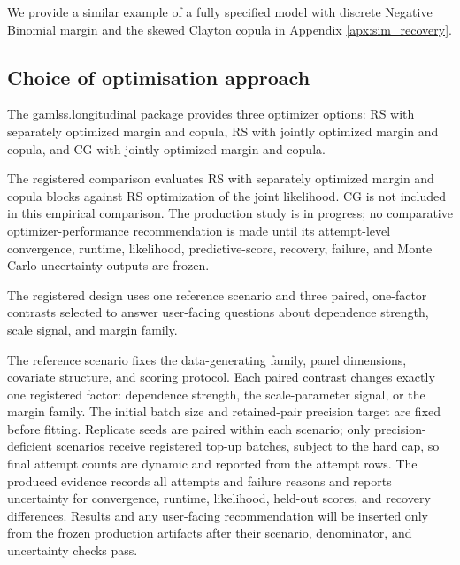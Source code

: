 \documentclass{article}
\begin{document}

We provide a similar example of a fully specified model with discrete Negative Binomial margin and the skewed Clayton copula in Appendix \ref{apx:sim_recovery}.

\subsection{Choice of optimisation approach} \label{sec:sim_jvs}
The gamlss.longitudinal package provides three optimizer options: RS with separately optimized margin and copula, RS with jointly optimized margin and copula, and CG with jointly optimized margin and copula. 

The registered comparison evaluates RS with separately optimized margin and copula blocks against RS optimization of the joint likelihood. CG is not included in this empirical comparison. The production study is in progress; no comparative optimizer-performance recommendation is made until its attempt-level convergence, runtime, likelihood, predictive-score, recovery, failure, and Monte Carlo uncertainty outputs are frozen.

The registered design uses one reference scenario and three paired, one-factor contrasts selected to answer user-facing questions about dependence strength, scale signal, and margin family.

The reference scenario fixes the data-generating family, panel dimensions,
covariate structure, and scoring protocol.  Each paired contrast changes exactly
one registered factor: dependence strength, the scale-parameter signal, or the
margin family. The initial batch size and retained-pair precision target are
fixed before fitting. Replicate seeds are paired within each scenario; only
precision-deficient scenarios receive registered top-up batches, subject to the
hard cap, so final attempt counts are dynamic and reported from the attempt
rows. The produced evidence records all attempts and failure reasons and reports
uncertainty for convergence, runtime, likelihood, held-out scores, and recovery
differences. Results and any
user-facing recommendation will be inserted only from the frozen production
artifacts after their scenario, denominator, and uncertainty checks pass.
\end{document}
